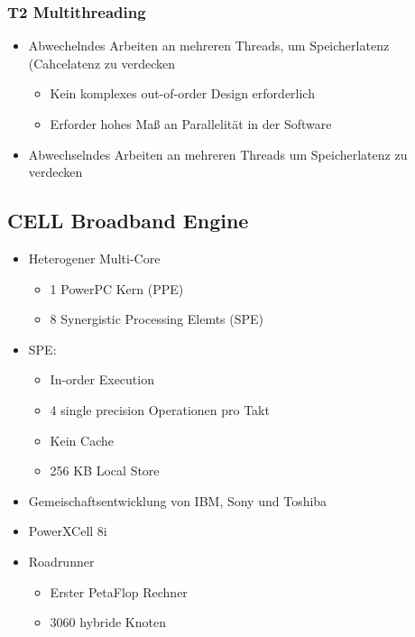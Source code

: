 \subsubsection{T2 Multithreading}
\begin{itemize}
	\item Abwechelndes Arbeiten an mehreren Threads, um Speicherlatenz (Cahcelatenz zu verdecken
	\begin{itemize}
		\item Kein komplexes out-of-order Design erforderlich
		\item Erforder hohes Maß an Parallelität in der Software
	\end{itemize}
	\item Abwechselndes Arbeiten an mehreren Threads um Speicherlatenz zu verdecken
\end{itemize}
\subsection{CELL Broadband Engine}
\begin{itemize}
	\item Heterogener Multi-Core
	\begin{itemize}
		\item 1 PowerPC Kern (PPE)
		\item 8 Synergistic Processing Elemts (SPE)
	\end{itemize}
	\item SPE:
	\begin{itemize}
		\item In-order Execution
		\item 4 single precision Operationen pro Takt
		\item Kein Cache
		\item 256 KB Local Store
	\end{itemize}
	\item Gemeischaftsentwicklung von IBM, Sony und Toshiba
	\item PowerXCell 8i
	\item Roadrunner
	\begin{itemize}
		\item Erster PetaFlop Rechner
		\item 3060 hybride Knoten
	\end{itemize}
\end{itemize}
